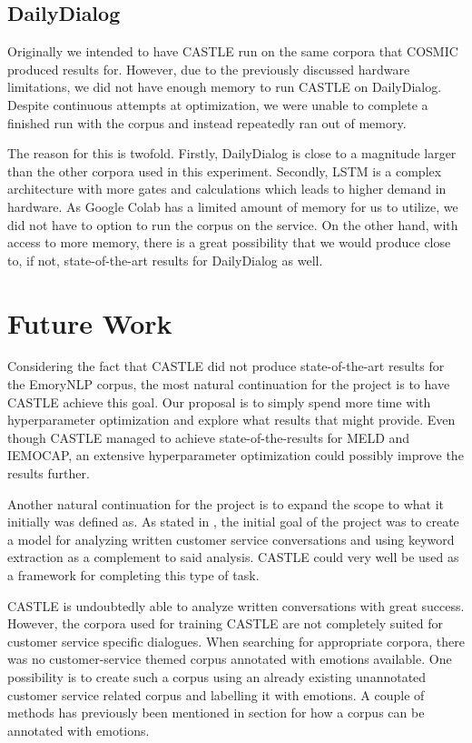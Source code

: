 \documentclass[nofilelist]{cslthse-msc}
\begin{document}
\subsection*{DailyDialog}
Originally we intended to have CASTLE run on the same corpora that COSMIC produced results for. However, due to the previously discussed hardware limitations, we did not have enough memory to run CASTLE on DailyDialog. Despite continuous attempts at optimization, we were unable to complete a finished run with the corpus and instead repeatedly ran out of memory. 

The reason for this is twofold. Firstly, DailyDialog is close to a magnitude larger than the other corpora used in this experiment. Secondly, LSTM is a complex architecture with more gates and calculations which leads to higher demand in hardware. As Google Colab has a limited amount of memory for us to utilize, we did not have to option to run the corpus on the service. On the other hand, with access to more memory, there is a great possibility that we would produce close to, if not, state-of-the-art results for DailyDialog as well. 

\section{Future Work}


Considering the fact that CASTLE did not produce state-of-the-art results for the EmoryNLP corpus, the most natural continuation for the project is to have CASTLE achieve this goal. Our proposal is to simply spend more time with hyperparameter optimization and explore what results that might provide. Even though CASTLE managed to achieve state-of-the-results for MELD and IEMOCAP, an extensive hyperparameter optimization could possibly improve the results further.  


Another natural continuation for the project is to expand the scope to what it initially was defined as. As stated in , the initial goal of the project was to create a model for analyzing written customer service conversations and using keyword extraction as a complement to said analysis. CASTLE could very well be used as a framework for completing this type of task.


CASTLE is undoubtedly able to analyze written conversations with great success. However, the corpora used for training CASTLE are not completely suited for customer service specific dialogues. When searching for appropriate corpora, there was no customer-service themed corpus annotated with emotions available. One possibility is to create such a corpus using an already existing unannotated customer service related corpus and labelling it with emotions. A couple of methods has previously been mentioned in section  for how a corpus can be annotated with emotions. 
\end{document}
